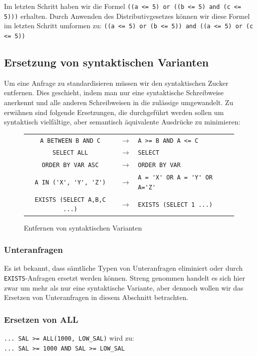 Im letzten Schritt haben wir die Formel \verb|((a <= 5) or ((b <= 5) and (c <= 5)))| erhalten. Durch Anwenden des Distributivgesetzes können wir diese Formel im letzten Schritt umformen zu: \verb|((a <= 5) or (b <= 5)) and ((a <= 5) or (c <= 5))|

\subsection{Ersetzung von syntaktischen Varianten}

Um eine Anfrage zu standardisieren müssen wir den syntaktischen Zucker entfernen. Dies geschieht, indem man nur eine syntaktische Schreibweise anerkennt und alle anderen Schreibweisen in die zulässige umgewandelt. Zu erwähnen sind folgende Ersetzungen, die durchgeführt werden sollen um syntaktisch vielfältige, aber semantisch äquivalente Ausdrücke zu minimieren:

\begin{figure}[h]
\begin{tabular}{ccl}
\verb|A BETWEEN B AND C| & $\to$  & \verb|A >= B AND A <= C|\\
\verb|SELECT ALL| & $\to$ & \verb|SELECT|\\
\verb|ORDER BY VAR ASC| &  $\to$ & \verb|ORDER BY VAR|\\
\verb|A IN ('X', 'Y', 'Z')| & $\to$ & \verb|A = 'X' OR A = 'Y' OR A='Z'|\\
\verb|EXISTS (SELECT A,B,C ...)| & $\to$ & \verb|EXISTS (SELECT 1 ...)|\\
\end{tabular}
\caption{Entfernen von syntaktischen Varianten}
\end{figure}

\subsubsection*{Unteranfragen}

Es ist bekannt, dass sämtliche Typen von Unteranfragen eliminiert oder durch \verb|EXISTS|-Anfragen ersetzt werden können. Streng genommen handelt es sich hier zwar um mehr als nur eine syntaktische Variante, aber dennoch wollen wir das Ersetzen von Unteranfragen in diesem Abschnitt betrachten.
\subsubsection*{Ersetzen von ALL}

\verb|... SAL >= ALL(1000, LOW_SAL)|  wird zu:\\
\verb|... SAL >= 1000 AND SAL >= LOW_SAL|

